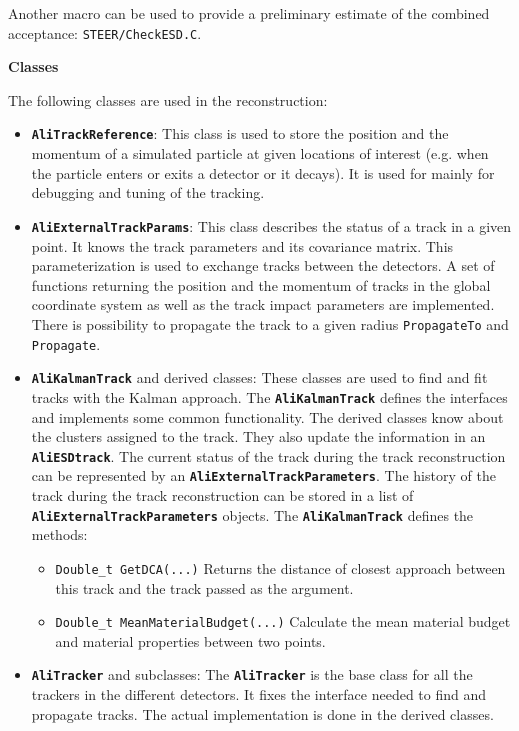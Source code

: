 \documentclass[12pt,a4paper,twoside]{article}
\newcommand{\class}[1]{\texttt{\textbf{#1}}\xspace}
\newcommand{\method}[1]{\texttt{#1}\xspace}
\begin{document}
Another macro can be used to provide a preliminary estimate of the
combined acceptance: \texttt{STEER/CheckESD.C}.

\textbf{Classes}

The following classes are used in the reconstruction:
\begin{itemize}
\item \class{AliTrackReference}:
  This class is used to store the position and the momentum of a
  simulated particle at given locations of interest (e.g. when the
  particle enters or exits a detector or it decays). It is used for
  mainly for debugging and tuning of the tracking.

\item \class{AliExternalTrackParams}:
  This class describes the status of a track in a given point.
  It knows the track parameters and its covariance matrix.
  This parameterization is used to exchange tracks between the detectors.
  A set of functions returning the position and the momentum of tracks   
  in the global coordinate system as well as the track impact parameters 
  are implemented. There is possibility to propagate the track to a
  given radius \method{PropagateTo} and \method{Propagate}.

\item \class{AliKalmanTrack} and derived classes:
  These classes are used to find and fit tracks with the Kalman approach.
  The \class{AliKalmanTrack} defines the interfaces and implements some
  common functionality. The derived classes know about the clusters
  assigned to the track. They also update the information in an
  \class{AliESDtrack}. 
  The current status of the track during the track reconstruction can be
  represented by an \class{AliExternalTrackParameters}. 
  The history of the track during the track reconstruction can be stored
  in a list of \class{AliExternalTrackParameters} objects. 
  The \class{AliKalmanTrack} defines the methods:
  \begin{itemize}
  \item \method{Double\_t GetDCA(...)} Returns the distance
    of closest approach between this track and the track passed as the
    argument. 
  \item \method{Double\_t MeanMaterialBudget(...)} Calculate the mean
    material budget and material properties between two points.
  \end{itemize}

\item \class{AliTracker} and subclasses: 
  The \class{AliTracker} is the base class for all the trackers in the
  different detectors. It fixes the interface needed to find and
  propagate tracks. The actual implementation is done in the derived classes.


\end{itemize}
\end{document}
